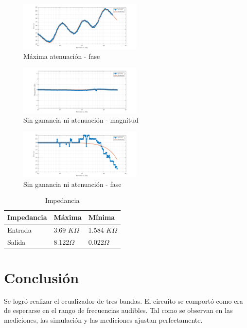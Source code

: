 \documentclass[../../tc_tp3_main.tex]{subfiles}
\begin{document}
\begin{figure}[H]
\centering
\includegraphics[width=0.55\textwidth]{imagenes/min_f.png}
\caption{M\'axima atenuación - fase} 
\end{figure}

\begin{figure}[H]
\centering
\includegraphics[width=0.55\textwidth]{imagenes/med_m.png}
\caption{Sin ganancia ni atenuación - magnitud} 
\end{figure}

\begin{figure}[H]
\centering
\includegraphics[width=0.55\textwidth]{imagenes/med_f.png}
\caption{Sin ganancia ni atenuación - fase} 
\end{figure}

\begin{table}[h]
\begin{center}
\begin{tabular}{|l|l|l|}
\hline
Impedancia & M\'axima & M\'inima \\
\hline \hline
Entrada& 3.69 $K \Omega$  &1.584 $K \Omega$ \\ \hline
Salida&8.122$\Omega$  &0.022$\Omega$  \\ \hline


\end{tabular}
\caption{Impedancia} 
\label{tab:MImp}
\end{center}
\end{table}
\section{Conclusión}
Se logró realizar el ecualizador de tres bandas. El circuito se comportó como era de esperarse en el rango de frecuencias audibles. Tal como se observan en las mediciones, las simulación y las mediciones ajustan perfectamente.


\end{document}
